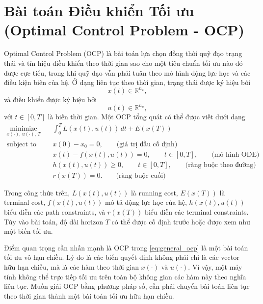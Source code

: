 \section{Bài toán Điều khiển Tối ưu (Optimal Control Problem - OCP)}
\label{sec:ocp}

Optimal Control Problem (OCP) là bài toán lựa chọn đồng thời quỹ đạo trạng thái
và tín hiệu điều khiển theo thời gian sao cho một tiêu chuẩn tối ưu nào đó được
cực tiểu, trong khi quỹ đạo vẫn phải tuân theo mô hình động lực học và các điều
kiện biên của hệ. Ở dạng liên tục theo thời gian, trạng thái được ký hiệu bởi
\[
    x(t)\in\mathbb{R}^{n_x},
\]
và điều khiển được ký hiệu bởi
\[
    u(t)\in\mathbb{R}^{n_u},
\]
với $t\in[0,T]$ là biến thời gian. Một OCP tổng quát có thể được viết dưới dạng
\begin{equation}
    \begin{aligned}
        \underset{x(\cdot),\,u(\cdot),\,T}{\text{minimize}}
        \quad &
        \int_{0}^{T} L(x(t),u(t))\,dt + E(x(T))
        \\
        \text{subject to}
        \quad &
        x(0)-x_0=0,
        \qquad \text{(giá trị đầu cố định)}
        \\
              &
        \dot{x}(t)-f(x(t),u(t))=0,
        \qquad t\in[0,T],
        \qquad \text{(mô hình ODE)}
        \\
              &
        h(x(t),u(t))\ge 0,
        \qquad t\in[0,T],
        \qquad \text{(ràng buộc theo đường)}
        \\
              &
        r(x(T))=0.
        \qquad \text{(ràng buộc cuối)}
    \end{aligned}
    \label{eq:general_ocp}
\end{equation}

Trong công thức trên, $L(x(t),u(t))$ là running cost, $E(x(T))$ là terminal
cost, $f(x(t),u(t))$ mô tả động lực học của hệ, $h(x(t),u(t))$ biểu diễn các
path constraints, và $r(x(T))$ biểu diễn các terminal constraints. Tùy vào bài
toán, độ dài horizon $T$ có thể được cố định trước hoặc được xem như một biến
tối ưu.

Điểm quan trọng cần nhấn mạnh là OCP trong \eqref{eq:general_ocp} là một bài toán tối ưu vô hạn chiều. Lý do là các biến quyết định không phải chỉ là các vector hữu hạn chiều, mà là các hàm theo thời gian $x(\cdot)$ và $u(\cdot)$. Vì vậy, một máy tính không thể trực tiếp tối ưu trên toàn bộ không gian các hàm này theo nghĩa liên tục. Muốn giải OCP bằng phương pháp số, cần phải chuyển bài toán liên tục theo thời gian thành một bài toán tối ưu hữu hạn chiều.

